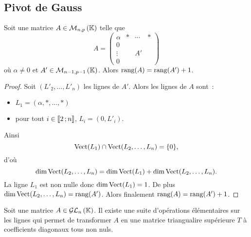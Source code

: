 \subsection{Pivot de Gauss}
%
\begin{lemme}
  Soit une matrice \(A \in \mathcal{M}_{n,p}\left(\mathbb{K}\right)\) telle que
  \begin{equation}
    A =
    \begin{pmatrix}
      \alpha & * & \cdots & * \\
      0 & & & \\
      \vdots & & A' & \\
    0 & & & \end{pmatrix}
  \end{equation}
  où \(\alpha \neq 0\) et \(A'\in \mathcal{M}_{n-1,p-1}\left(\mathbb{K}\right)\). Alors \(\operatorname{rang}(A) =
  \operatorname{rang}(A')+1\).
\end{lemme}
\begin{proof}
  Soit \((L'_2, \ldots, L'_n)\) les lignes de \(A'\). Alors les lignes de \(A\)
  sont~:
  \begin{itemize}
    \item \(L_1 = (\alpha, *, \ldots, *)\)
    \item pour tout \(i \in \mathopen{\llbracket}2\mathclose{}\mathpunct{};n\mathclose{\rrbracket}\), \(L_i = (0,L'_i)\).
  \end{itemize}
  Ainsi
  \begin{equation}
    \operatorname{Vect}(L_1) \cap \operatorname{Vect}(L_2, \ldots, L_n) = \{0\},
  \end{equation}
  d'où
  \begin{equation}
    \dim \operatorname{Vect}(L_2, \ldots, L_n) = \dim \operatorname{Vect}(L_1) + \dim
    \operatorname{Vect}(L_2, \ldots, L_n).
  \end{equation}
  La ligne \(L_1\) est non nulle donc \(\dim \operatorname{Vect}(L_1) = 1\). De plus
  \(\dim \operatorname{Vect}(L_2, \ldots, L_n) = \operatorname{rang}(A')\). Alors finalement \(\operatorname{rang}(A)
  = \operatorname{rang}(A')+1\).
\end{proof}
%
\begin{prop}
  Soit une matrice \(A \in \mathcal{GL}_{n}\left(\mathbb{K}\right)\). Il existe une suite d'opérations
  élémentaires sur les lignes qui permet de transformer \(A\) en une matrice
  triangualire supérieure \(T\) à coefficients diagonaux tous non nuls.
\end{prop}
